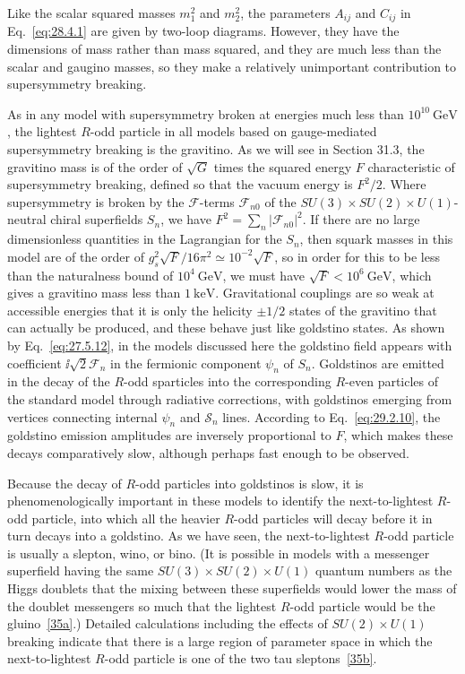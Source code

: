 Like the scalar squared masses \(m_1^2\) and \(m_2^2\), the parameters
\(A_{ij}\) and \(C_{ij}\) in Eq.~\eqref{eq:28.4.1} are given by two-loop
diagrams. However, they have the dimensions of mass rather than mass
squared, and they are much less than the scalar and gaugino masses, so
they make a relatively unimportant contribution to supersymmetry breaking.

As in any model with supersymmetry broken at energies much less than
\(10^{10}\ \mathrm{GeV}\), the lightest \(R\)-odd particle in all models
based on gauge-mediated supersymmetry breaking is the gravitino. As we
will see in Section 31.3, the gravitino mass is of the order of
\(\sqrt{G}\) times the squared energy \(F\) characteristic of
supersymmetry breaking, defined so that the vacuum energy is \(F^2/2\).
Where supersymmetry is broken by the \(\mathcal{F}\)-terms
\(\mathcal{F}_{n0}\) of the
\(SU(3)\times SU(2)\times U(1)\)-neutral chiral
superfields \(S_n\), we have
\(F^2=\sum_n\lvert\mathcal{F}_{n0}\rvert^2\). If there are no large
dimensionless quantities in the Lagrangian for the \(S_n\), then squark
masses in this model are of the order of
\(g_s^2\sqrt{F}/16\pi^2\simeq10^{-2}\sqrt{F}\), so in order for this to
be less than the naturalness bound of \(10^4\ \mathrm{GeV}\), we must have
\(\sqrt{F}<10^6\ \mathrm{GeV}\), which gives a gravitino mass less than
\(1\ \mathrm{keV}\). Gravitational couplings are so weak at accessible
energies that it is only the helicity \(\pm1/2\) states of the gravitino
that can actually be produced, and these behave just like goldstino
states. As shown by Eq.~\eqref{eq:27.5.12}, in the models discussed here
the goldstino field appears with coefficient \(\ii\sqrt{2}\mathcal{F}_n\)
in the fermionic component \(\psi_n\) of \(S_n\). Goldstinos are emitted
in the decay of the \(R\)-odd sparticles into the corresponding \(R\)-even
particles of the standard model through radiative corrections, with
goldstinos emerging from vertices connecting internal \(\psi_n\) and
\(\mathcal{S}_n\) lines. According to Eq.~\eqref{eq:29.2.10}, the
goldstino emission amplitudes are inversely proportional to \(F\), which
makes these decays comparatively slow, although perhaps fast enough to be
observed.

Because the decay of \(R\)-odd particles into goldstinos is slow, it is
phenomenologically important in these models to identify the
next-to-lightest \(R\)-odd particle, into which all the heavier \(R\)-odd
particles will decay before it in turn decays into a goldstino. As we have
seen, the next-to-lightest \(R\)-odd particle is usually a slepton, wino,
or bino. (It is possible in models with a messenger superfield having the
same \(SU(3)\times SU(2)\times U(1)\) quantum numbers as
the Higgs doublets that the mixing between these superfields would lower
the mass of the doublet messengers so much that the lightest \(R\)-odd
particle would be the gluino~\hyperref[ch28-ref-35a]{[35a]}.) Detailed
calculations including the effects of \(SU(2)\times U(1)\)
breaking indicate that there is a large region of parameter space in which
the next-to-lightest \(R\)-odd particle is one of the two tau
sleptons~\hyperref[ch28-ref-35b]{[35b]}.
